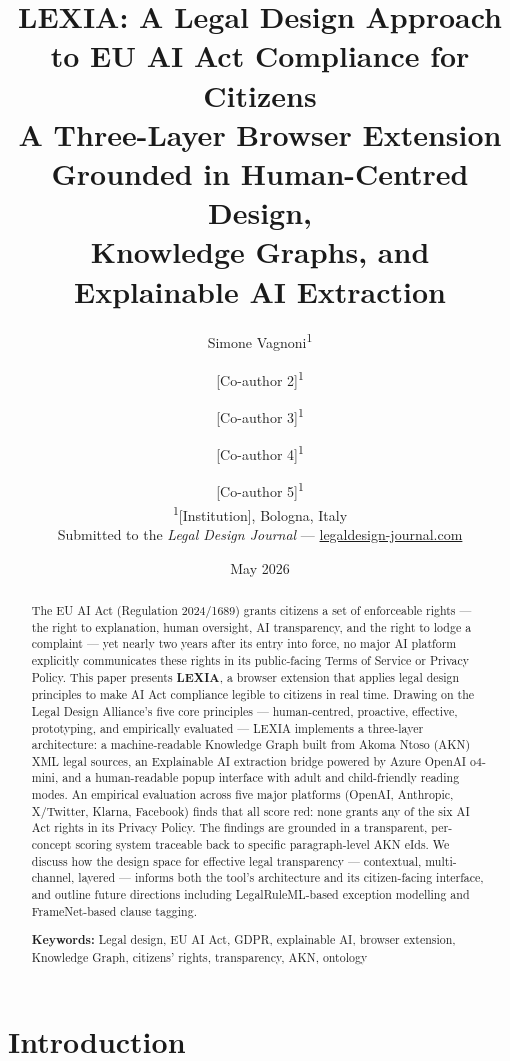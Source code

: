 \documentclass[12pt, a4paper]{article}
\title{
  \textbf{LEXIA: A Legal Design Approach to EU AI Act Compliance for Citizens}\\[0.5em]
  \large A Three-Layer Browser Extension Grounded in Human-Centred Design,\\
  Knowledge Graphs, and Explainable AI Extraction
}
\author{
  Simone Vagnoni\textsuperscript{1} \and
  [Co-author 2]\textsuperscript{1} \and
  [Co-author 3]\textsuperscript{1} \and
  [Co-author 4]\textsuperscript{1} \and
  [Co-author 5]\textsuperscript{1}
  \\[0.5em]
  \small\textsuperscript{1}[Institution], Bologna, Italy\\
  \small Submitted to the \textit{Legal Design Journal} ---
  \href{https://legaldesign-journal.com}{legaldesign-journal.com}
}
\date{May 2026}
\begin{document}
\maketitle
\thispagestyle{fancy}

\begin{abstract}
\noindent
The EU AI Act (Regulation 2024/1689) grants citizens a set of enforceable rights --- the right to explanation, human oversight, AI transparency, and the right to lodge a complaint --- yet nearly two years after its entry into force, no major AI platform explicitly communicates these rights in its public-facing Terms of Service or Privacy Policy. This paper presents \textbf{LEXIA}, a browser extension that applies legal design principles to make AI Act compliance legible to citizens in real time. Drawing on the Legal Design Alliance's five core principles --- human-centred, proactive, effective, prototyping, and empirically evaluated --- LEXIA implements a three-layer architecture: a machine-readable Knowledge Graph built from Akoma Ntoso (AKN) XML legal sources, an Explainable AI extraction bridge powered by Azure OpenAI o4-mini, and a human-readable popup interface with adult and child-friendly reading modes. An empirical evaluation across five major platforms (OpenAI, Anthropic, X/Twitter, Klarna, Facebook) finds that all score red: none grants any of the six AI Act rights in its Privacy Policy. The findings are grounded in a transparent, per-concept scoring system traceable back to specific paragraph-level AKN eIds. We discuss how the design space for effective legal transparency --- contextual, multi-channel, layered --- informs both the tool's architecture and its citizen-facing interface, and outline future directions including LegalRuleML-based exception modelling and FrameNet-based clause tagging.

\vspace{0.5em}
\noindent\textbf{Keywords:} Legal design, EU AI Act, GDPR, explainable AI, browser extension, Knowledge Graph, citizens' rights, transparency, AKN, ontology
\end{abstract}

\vspace{1em}

\section{Introduction}
\end{document}
